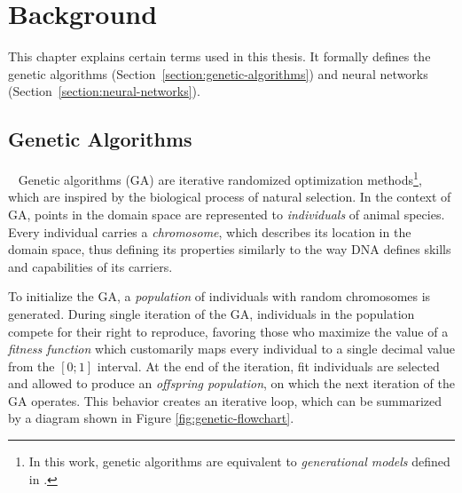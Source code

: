 \chapter{Background}
This chapter explains certain terms used in this thesis. It formally defines the genetic algorithms (Section~\ref{section:genetic-algorithms}) and neural networks (Section~\ref{section:neural-networks}).

\section{Genetic Algorithms}~\label{section:genetic-algorithms}
Genetic algorithms (GA) are iterative randomized optimization methods\footnote{In this work, genetic algorithms are equivalent to \textit{generational models} defined in \cite{AdaptationInSystems}.}, which are inspired by the biological process of natural selection. In the context of GA, points in the domain space are represented to \textit{individuals} of animal species. Every individual carries a \textit{chromosome}, which describes its location in the domain space, thus defining its properties similarly to the way DNA defines skills and capabilities of its carriers.

To initialize the GA, a \textit{population} of individuals with random chromosomes is generated. During single iteration of the GA, individuals in the population compete for their right to reproduce, favoring those who maximize the value of a \textit{fitness function} which customarily maps every individual to a single decimal value from the $[0;1]$ interval. At the end of the iteration, fit individuals are selected and allowed to produce an \textit{offspring population}, on which the next iteration of the GA operates. This behavior creates an iterative loop, which can be summarized by a diagram shown in Figure \ref{fig:genetic-flowchart}.

